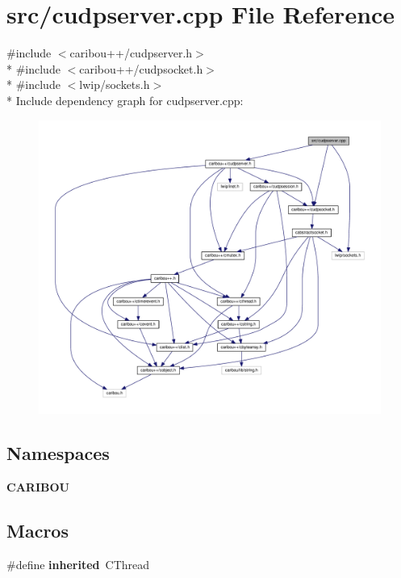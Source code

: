 \section{src/cudpserver.cpp File Reference}
\label{cudpserver_8cpp}
{\ttfamily \#include $<$caribou++/cudpserver.\-h$>$}\\*
{\ttfamily \#include $<$caribou++/cudpsocket.\-h$>$}\\*
{\ttfamily \#include $<$lwip/sockets.\-h$>$}\\*
Include dependency graph for cudpserver.\-cpp\-:\nopagebreak
\begin{figure}[H]
\begin{center}
\leavevmode
\includegraphics[width=350pt]{cudpserver_8cpp__incl}
\end{center}
\end{figure}
\subsection*{Namespaces}
\begin{DoxyCompactItemize}
\item 
{\bf C\-A\-R\-I\-B\-O\-U}
\end{DoxyCompactItemize}
\subsection*{Macros}
\begin{DoxyCompactItemize}
\item 
\#define {\bf inherited}~C\-Thread
\end{DoxyCompactItemize}


